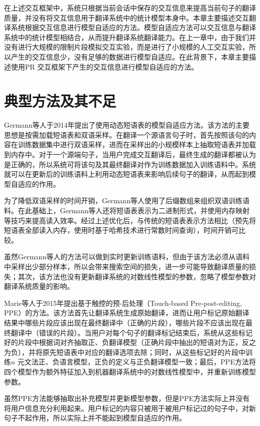 \documentclass[master, winfont]{njuthesis}
\begin{document}
在上述交互框架中，系统只根据当前会话中保存的交互信息来提高当前句子的翻译质量，并没有将交互信息用于翻译系统中的统计模型本身中。本章主要描述交互翻译系统根据交互信息进行模型自适应的方法。模型自适应方法可以交互信息与翻译系统中的统计模型相结合，从而提升翻译系统翻译能力。在上一章中，由于我们并没有进行大规模的限制片段模拟交互实验，而是进行了小规模的人工交互实验，所以产生的交互信息少，没有足够的数据进行模型自适应。在此背景下，本章主要描述使用PR 交互框架下产生的交互信息进行模型自适应的方法。
\section{典型方法及其不足}
\label{section:typical}
Germann等人\cite{germann2014dynamic}于2014年提出了使用动态短语表的模型自适应方法。该方法的主要思想是按需加载短语表\cite{zens2007efficient}和双语采样。在翻译一个源语言句子时，首先按照该句的内容在训练数据集中进行双语采样，进而在采样出的小规模样本上抽取短语表并加载到内存中。对于一个源端句子，当用户完成交互翻译后，最终生成的翻译都被认为是正确的，所以系统可将该句及其最终翻译对作为训练数据加入训练语料中。系统就可以在更新后的训练语料上利用动态短语表来影响后续句子的翻译，从而起到模型自适应的作用。

为了降低双语采样的时间开销，Germann等人使用了后缀数组来组织双语训练语料。在此基础上，Germann等人还将短语表表示为二进制形式，并使用内存映射等技巧来提高读入效率。经过上述优化后，与传统的短语表表示方法相比（预先将短语表全部读入内存，使用时基于哈希技术进行常数时间查询），时间开销可比较。

虽然Germann等人的方法可以做到实时更新训练语料，但由于该方法必须从语料中采样出少部分样本，所以会带来搜索空间的损失，进一步可能导致翻译质量的损失；其次，该方法也没有更新翻译系统的对数线性模型的参数，忽略了模型参数对翻译系统质量的影响。

Marie等人\cite{marietouch}于2015年提出基于触控的预-后处理（Touch-based Pre-post-editing, PPE）的方法。该方法首先让翻译系统生成原始翻译，进而让用户标记原始翻译结果中哪些片段应该出现在最终翻译中（正确的片段），哪些片段不应该出现在最终翻译中（错误的片段）。当用户对每个句子的翻译标记结束后，系统从这些标记好的片段中根据词对齐抽取正、负翻译模型（正确片段中抽出的短语对为正，反之为负），并将原先短语表中对应的翻译选项去除；同时，从这些标记好的片段中训练$n$ 元文法正、负语言模型，正负的定义与正负翻译模型一致；最后，PPE方法将四个模型作为额外特征加入到机器翻译系统中的对数线性模型中，并重新训练模型参数。

虽然PPE方法能够抽取出补充模型并更新模型参数，但是PPE方法实际上并没有将用户信息充分利用起来。用户标记的内容只被用于被用户标记过的句子中，对新句子不起作用，所以实际上并不能起到模型自适应的作用。
\end{document}
